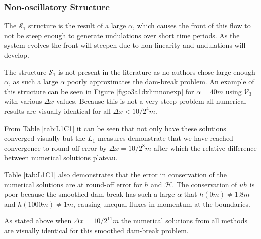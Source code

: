 \documentclass[times]{elsarticle}
\begin{document}
\subsubsection{Non-oscillatory Structure}
The $\mathcal{S}_1$ structure is the result of a large $\alpha$, which causes the front of this flow to not be steep enough to generate undulations over short time periods. As the system evolves the front will steepen due to non-linearity and undulations will develop.

The structure $\mathcal{S}_1$ is not present in the literature as no authors chose large enough $\alpha$, as such a large $\alpha$ poorly approximates the dam-break problem. An example of this structure can be seen in Figure \ref{fig:o3a1dxlimnonexp} for $\alpha = 40m$ using $\mathcal{V}_3$ with various $\Delta x$ values. Because this is not a very steep problem all numerical results are visually identical for all $\Delta x < 10 / 2^4m$.

From Table \ref{tab:L1C1} it can be seen that not only have these solutions converged visually but the $L_1$ measures demonstrate that we have reached convergence to round-off error by $\Delta x = 10 / 2^8m$ after which the relative difference between numerical solutions plateau. 

Table \ref{tab:L1C1} also demonstrates that the error in conservation of the numerical solutions are at round-off error for $h$ and $\mathcal{H}$. The conservation of $uh$ is poor because the smoothed dam-break has such a large $\alpha$ that $h(0m) \neq 1.8m$ and $h(1000m) \neq 1m$, causing unequal fluxes in momentum at the boundaries. 

As stated above when $\Delta x = 10/2^{11}m$ the numerical solutions from all methods are visually identical for this smoothed dam-break problem. 
\end{document}
